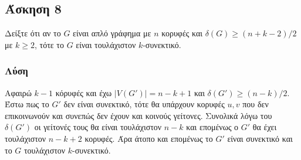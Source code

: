 \subsection*{Άσκηση 8}

Δείξτε ότι αν το $G$ είναι απλό γράφημα με $n$ κορυφές και $\delta(G) \ge (n + k -2)/2$ με $k \ge 2$, τότε το $G$ είναι τουλάχιστον $k$-συνεκτικό.

\subsubsection*{Λύση}

Αφαιρώ $k-1$ κόρυφές και έχω $|V(G')| = n - k + 1$ και $\delta(G') \ge (n-k)/2$. 
Έστω πως το $G'$ δεν είναι συνεκτικό, τότε θα υπάρχουν κορυφές $u,v$ που δεν επικοινωνούν και συνεπώς
δεν έχουν και κοινούς γείτονες. Συνολικά λόγω του $\delta(G')$ οι γείτονές τους θα είναι τουλάχιστον $n-k$ 
και επομένως ο $G'$ θα έχει τουλάχιστον $n-k+2$ κορυφές. Άρα άτοπο και επομένως το $G'$ είναι συνεκτικό
και το $G$ τουλάχιστον $k$-συνεκτικό.
